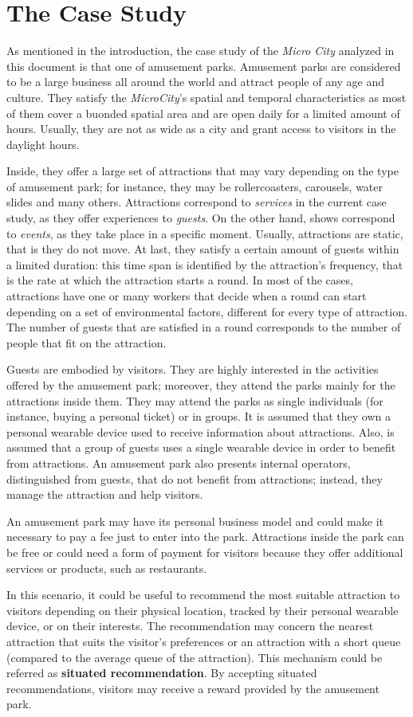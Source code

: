 \section{The Case Study}
\label{sec:case}

As mentioned in the introduction, the case study of the \textit{Micro City} analyzed in this document is that one of amusement parks. Amusement parks are considered to be a large business all around the world and attract people of any age and culture. They satisfy the \textit{MicroCity}'s spatial and temporal characteristics as most of them cover a buonded spatial area and are open daily for a limited amount of hours. Usually, they are not as wide as a city and grant access to visitors in the daylight hours.

Inside, they offer a large set of attractions that may vary depending on the type of amusement park; for instance, they may be rollercoasters, carousels, water slides and many others. Attractions correspond to \textit{services} in the current case study, as they offer experiences to \textit{guests}. On the other hand, shows correspond to \textit{events}, as they take place in a specific moment. Usually, attractions are static, that is they do not move. At last, they satisfy a certain amount of guests within a limited duration: this time span is identified by the attraction's frequency, that is the rate at which the attraction starts a round. In most of the cases, attractions have one or many workers that decide when a round can start depending on a set of environmental factors, different for every type of attraction. The number of guests that are satisfied in a round corresponds to the number of people that fit on the attraction.

Guests are embodied by visitors. They are highly interested in the activities offered by the amusement park; moreover, they attend the parks mainly for the attractions inside them. They may attend the parks as single individuals (for instance, buying a personal ticket) or in groups. It is assumed that they own a personal wearable device used to receive information about attractions. Also, is assumed that a group of guests uses a single wearable device in order to benefit from attractions. An amusement park also presents internal operators, distinguished from guests, that do not benefit from attractions; instead, they manage the attraction and help visitors.

An amusement park may have its personal business model and could make it necessary to pay a fee just to enter into the park. Attractions inside the park can be free or could need a form of payment for visitors because they offer additional services or products, such as restaurants.

In this scenario, it could be useful to recommend the most suitable attraction to visitors depending on their physical location, tracked by their personal wearable device, or on their interests. The recommendation may concern the nearest attraction that suits the visitor's preferences or an attraction with a short queue (compared to the average queue of the attraction). This mechanism could be referred as \textbf{situated recommendation}. By accepting situated recommendations, visitors may receive a reward provided by the amusement park.
